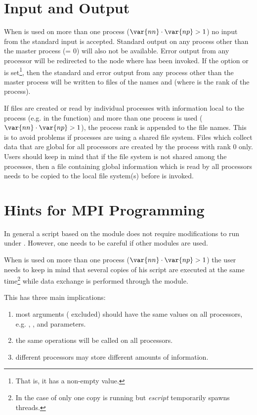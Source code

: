 \section{Input and Output}
When \MPI is used on more than one process ($\var{nn} \cdot \var{np} >1$) no
input from the standard input is accepted.
Standard output on any process other than the master process (= 0)
will also not be available.
Error output from any processor will be redirected to the node where  has been invoked.
If the  option or  is set\footnote{That is, it has a non-empty value.},
then the standard and error output from any process other than the master
process will be written to files of the names 
and  (where  is the rank of the process).

If files are created or read by individual \MPI processes with information
local to the process (e.g. in the  function)  and more than one
process is used ($\var{nn} \cdot \var{np} >1$), the \MPI process rank is
appended to the file names.
This is to avoid problems if processes are using a shared file system.
Files which collect data that are global for all \MPI processors are created
by the process with \MPI rank 0 only.
Users should keep in mind that if the file system is not shared among the
processes, then a file containing global information which is read by all
processors needs to be copied to the local file system(s) before  is invoked.
 
\section{Hints for MPI Programming}
In general a script based on the \escript module does not require
modifications to run under \MPI.
However, one needs to be careful if other modules are used. 

When \MPI is used on more than one process ($\var{nn} \cdot \var{np} >1$) the
user needs to keep in mind that several copies of his script are executed at
the same time\footnote{In the case of \OPENMP only one copy is running
but {\it escript} temporarily spawns threads.} while data exchange is
performed through the \escript module.

This has three main implications:
\begin{enumerate}
 \item most arguments ( excluded) should have the same values on all
     processors, e.g. , ,  and \numpy parameters.
 \item the same operations will be called on all processors.
 \item different processors may store different amounts of information.
\end{enumerate}

